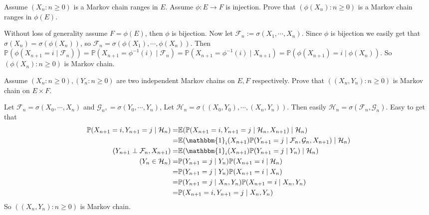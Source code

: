 \documentclass{ctexart}
\begin{document}
\begin{problem}\label{pro:3}
  Assume \((X_n:n \geq 0)\) is a Markov chain ranges in \(E\).
  Assume \(\phi:E \to F\) is injection.
  Prove that \((\phi(X_n):n \geq 0)\) is a Markov chain ranges in \(\phi(E)\).
\end{problem}
\begin{solution}
  Without loss of generality assume \(F=\phi(E)\), then \(\phi\) is bijection.
  Now let \(\mathcal{F}_n:=\sigma(X_1,\cdots,X_n)\).
  Since \(\phi\) is bijection we easily get that \(\sigma(X_n)=\sigma(\phi(X_n))\), so \(\mathcal{F}_n=\sigma(\phi(X_1),\cdots,\phi(X_n))\).
  Then \(\mathbb{P}(\phi(X_{n+1} =i \mid \mathcal{F}_n))=\mathbb{P}(X_{n+1}=\phi^{-1}(i) \mid \mathcal{F}_n)=\mathbb{P}(X_{n+1}=\phi^{-1}(i) \mid X_{n+1})=\mathbb{P}(\phi(X_{n+1})=i \mid \phi(X_n))\).
  So \((\phi(X_n):n \geq 0)\) is Markov chain.
\end{solution}
\begin{problem}\label{pro:4}
  Assume \((X_n:n \geq 0),(Y_n:n \geq 0)\) are two independent Markov chains on \(E,F\) respectively.
  Prove that \(((X_n,Y_n): n \geq 0)\) is Markov chain on \(E \times F\).
\end{problem}
\begin{solution}
  Let \(\mathcal{F}_n=\sigma(X_0,\cdots,X_n)\) and \(\mathcal{G}_n,=\sigma(Y_0,\cdots,Y_n)\),
  Let \(\mathcal{H}_n=\sigma((X_0,Y_0),\cdots,(X_n,Y_n))\).
  Then easily \(\mathcal{H}_n=\sigma(\mathcal{F}_n,\mathcal{G}_n)\).
  Easy to get that
  \[
    \begin{aligned}
      \mathbb{P}(X_{n+1} =i,Y_{n+1} =j \mid \mathcal{H}_n)
      =                                       & \mathbb{E}(\mathbb{P}(X_{n+1} =i,Y_{n+1} =j \mid \mathcal{H}_n,X_{n+1} )\mid \mathcal{H}_n)                            \\
      =                                       & \mathbb{E}(\mathbbm{1}_i(X_{n+1} )\mathbb{P}(Y_{n+1} =j \mid \mathcal{F}_n,\mathcal{G}_n,X_{n+1} ) \mid \mathcal{H}_n) \\
      (Y_{n+1} \perp \mathcal{F}_n,X_{n+1} )= & \mathbb{E}(\mathbbm{1}_i(X_{n+1} )\mathbb{P}(Y_{n+1} =j \mid Y_n) \mid \mathcal{H}_n)                                  \\
      (Y_n \in \mathcal{H}_n)=                & \mathbb{P}(Y_{n+1} =j \mid Y_n)\mathbb{P}(X_{n+1} =i \mid \mathcal{H}_n)                                               \\
      =                                       & \mathbb{P}(Y_{n+1} =j \mid Y_n)\mathbb{P}(X_{n+1} =i \mid X_n)                                                         \\
      =                                       & \mathbb{P}(Y_{n+1} =j \mid X_n,Y_n)\mathbb{P}(X_{n+1} =i \mid X_n,Y_n)                                                 \\
      =                                       & \mathbb{P}(X_{n+1} =i,Y_{n+1} =j \mid X_n,Y_n)
    \end{aligned}
  \]
  So \(((X_n,Y_n):n \geq 0)\) is Markov chain.
\end{solution}
\end{document}
